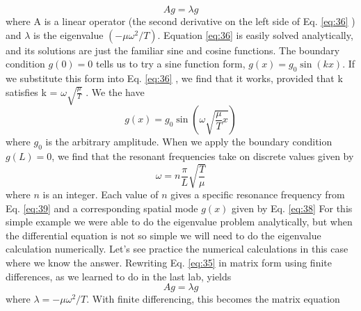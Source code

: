 				\begin{equation}\label{eq:37}
		Ag =\lambda g
				\end{equation}
				where A is a linear operator (the second derivative on the left side of Eq. \eqref{eq:36} )
and $\lambda$ is the eigenvalue $(−\mu \omega^2 / T )$.
Equation \eqref{eq:36} is easily solved analytically, and its solutions are just the familiar
sine and cosine functions. The boundary condition $g (0) = 0$ tells us to try a sine
function form, $g (x) = g_0 \sin(kx)$. If we substitute this form into Eq. \eqref{eq:36} , we find
that it works, provided that k satisfies k = $\omega \sqrt{\frac{\mu}{ T}}$ . We the have
		\begin{equation}\label{eq:38}
		g(x) = g_0\sin(\omega \sqrt{\frac{\mu}{T}x})
				\end{equation}		
				where $g_0$ is the arbitrary amplitude. When we apply the boundary condition
$g(L) = $0, we find that the resonant frequencies take on discrete values given by
\begin{equation}\label{eq:39}
		\omega = n \frac{\pi}{L}\sqrt{\frac{T}{\mu}}
				\end{equation}	
				where $n$ is an integer. Each value of $n$ gives a specific resonance frequency from
Eq. \eqref{eq:39} and a corresponding spatial mode $g(x)$ given by Eq. \eqref{eq:38}
For this simple example we were able to do the eigenvalue problem analytically, but when the differential equation is not so simple we will need to do the
eigenvalue calculation numerically. Let\rq s see practice the numerical calculations
in this case where we know the answer. Rewriting Eq. \eqref{eq:35} in matrix form using
finite differences, as we learned to do in the last lab, yields
\begin{equation}\label{eq:310}
		Ag = \lambda g
				\end{equation}
				where $ \lambda = - \mu\omega^2/T$. With finite differencing, this becomes the matrix equation

